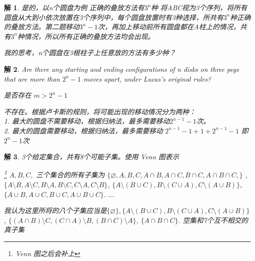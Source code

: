 \documentclass[mode=geye]{elegantnote}
\newtheorem{answer}{解}
\begin{document}
	\begin{answer}
		是的，以n个圆盘为例
		正确的叠放方法有$ 3^n $种 将ABC视为3个序列，将所有圆盘从大到小依次放置在3个序列中，每个圆盘放置时有3种选择，所共有$ 3^n $种正确的叠放方法。第二题移动$ 3^n-1 $次，再加上移动前所有圆盘都在A柱上的情况，共有$ 3^n $种情况，所以所有正确的叠放方法均会出现。
		
		我的思考，n个圆盘在3根柱子上任意放的方法有多少种？
	\end{answer}

	\begin{answer}
		Are there any starting and ending configurations of n disks on three pegs
		that are more than $ 2^n − 1 $ moves apart, under Lucas's original rules?
		
		是否存在 $ m > 2^n-1 $
		
		不存在。根据卢卡斯的规则，将可能出现的移动情况分为两种：\\		
		1. 最大的圆盘不需要移动，根据归纳法，最多需要移动$ 2^{n-1}-1 $次。\\	
		2. 最大的圆盘需要移动，根据归纳法，最多需要移动 $ 2^{n-1}-1 + 1 + 2^{n-1}-1 $ 即 $  2^{n}-1  $次
	\end{answer}
	
	\begin{answer}
		3个给定集合，共有8个可能子集。使用 Venn 图表示
		
		\footnote{Venn 图之后会补上}
		$ A, B, C, $ 三个集合的所有子集为 $ \{\varnothing, A, B, C, A\cap B, A\cap C, B\cap C, A \cap B \cap C, \} $ , $\{A\setminus B, A\setminus C, B\setminus A, B\setminus C, C\setminus A, C\setminus B \}$, $ \{A\setminus (B\cup C), B\setminus (C\cup A), C\setminus (A\cup B)\} $, $ \{A\cup B, A\cup C, B\cup C, A\cup B\cup C\} $. $ \dots $
		
		我认为这里所将的八个子集应当是$ \{\varnothing\}, \{A\setminus (B\cup C), B\setminus (C\cup A), C\setminus (A\cup B)\} $, $ \{(A\cap B)\setminus C, (C\cap A)\setminus B, (B\cap C)\setminus A \} $, $ \{A\cap B\cap C\} $. 空集和7个互不相交的真子集
	\end{answer}
	
\end{document}
